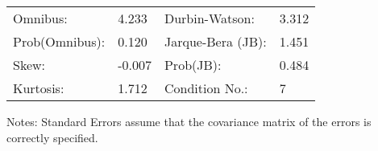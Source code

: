 \begin{table}[ht]
\begin{center}
\begin{tabular}{llll}
\hline
Omnibus:       & 4.233  & Durbin-Watson:    & 3.312  \\
Prob(Omnibus): & 0.120  & Jarque-Bera (JB): & 1.451  \\
Skew:          & -0.007 & Prob(JB):         & 0.484  \\
Kurtosis:      & 1.712  & Condition No.:    & 7      \\
\hline
\end{tabular}
\end{center}
\end{table}
\bigskip
Notes: \newline 
[1] Standard Errors assume that the covariance matrix of the errors is correctly specified.